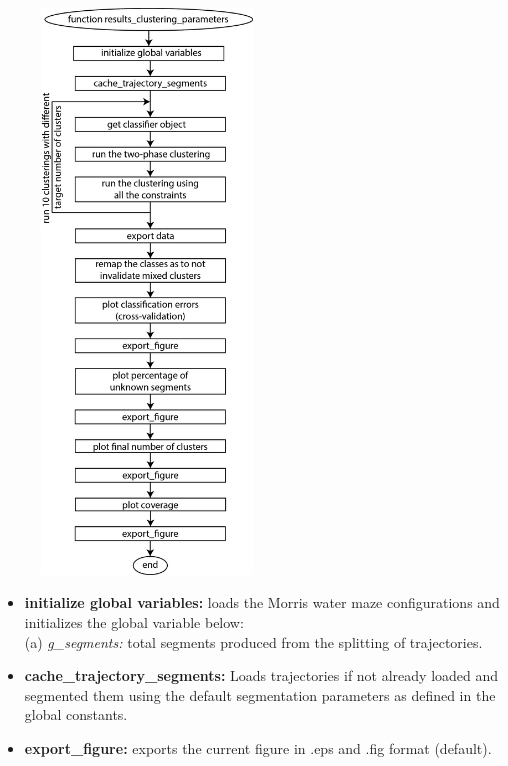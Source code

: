 \documentclass[12pt,titlepage]{article}
\begin{document}
\begin{doublespace}
\begin{figure}[H]
	\begin{center}
		\includegraphics[width=0.5\textwidth]{results_clustering_parameters.jpg}
		\label{sfig2}
	\end{center}
\end{figure}

\begin{itemize}
	\item\textbf{initialize global variables:} loads the Morris water maze configurations and initializes the global variable below:\\
	(a) \textit{g\_segments:} total segments produced from the splitting of trajectories.
	\item\textbf{cache\_trajectory\_segments:} Loads trajectories if not already loaded and segmented them using the default segmentation parameters as defined in the global constants.
	\item\textbf{export\_figure:} exports the current figure in .eps and .fig format (default).
\end{itemize}


\end{doublespace}
\end{document}
